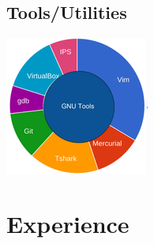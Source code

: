 \documentclass[]{priyesh-cv}
\begin{document}
\begin{aside}
  \section{Tools/Utilities}
    \vspace{20pt}
    \includegraphics[scale=0.62]{img/tools.png}
    ~
\end{aside}

\section{Experience}
\end{document}
